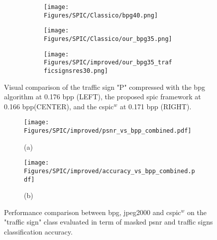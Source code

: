 \begin{figure}[!t]
    \begin{subfigure}{\textwidth}
        \centering
        \begin{subfigure}{0.333\textwidth}
            \centering
            \texttt{[image: Figures/SPIC/Classico/bpg40.png]}
            \caption*{}
        \end{subfigure}%
        \begin{subfigure}{0.333\textwidth}
            \centering
            \texttt{[image: Figures/SPIC/Classico/our\_bpg35.png]}
            \caption*{}
        \end{subfigure}%
        \begin{subfigure}{0.333\textwidth}
            \centering
            \texttt{[image: Figures/SPIC/improved/our\_bpg35\_trafficsignsres30.png]}
            \caption*{}
        \end{subfigure}
    \end{subfigure}
    \vspace{-1cm}
    \caption[Visual comparison between \acrshort{bpg}, \acrshort{spic} and \acrshort{cspic}$^w$ on the "traffic sign" class]{Visual comparison of the traffic sign "P"  compressed with the \acrshort{bpg} algorithm at 0.176 \gls{bpp} (LEFT), the proposed \acrshort{spic} framework at 0.166 \acrshort{bpp}(CENTER), and the \gls{cspic}$^w$ at 0.171 \acrshort{bpp} (RIGHT).}
    \label{fig: SPIC detail traffic sign}
\end{figure}
\begin{figure}[!t]
    \centering
    \begin{subfigure}[t]{0.49\textwidth}
        \centering
        \texttt{[image: Figures/SPIC/improved/psnr\_vs\_bpp\_combined.pdf]}
        \caption*{(a)}
    \end{subfigure}%
    \begin{subfigure}[t]{0.49\textwidth}
        \centering
        \texttt{[image: Figures/SPIC/improved/accuracy\_vs\_bpp\_combined.pdf]}
        \caption*{(b)}
    \end{subfigure}

    \caption[Performance comparison between the \acrshort{cspic}$^w$ and classical compression algorithms]{Performance comparison between \acrshort{bpg}, \acrshort{jpeg2000} and \acrshort{cspic}$^w$ on the "traffic sign" class evaluated in term of masked \acrshort{psnr} and traffic signs classification accuracy.}
    \label{fig: SPIC cspic metrics comparison}
\end{figure}

